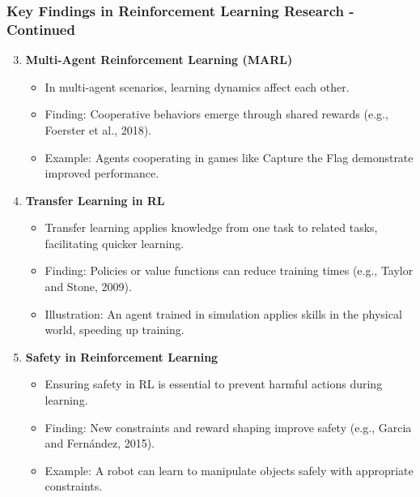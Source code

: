 \documentclass[aspectratio=169]{beamer}
\begin{document}
\begin{frame}[fragile]
    \frametitle{Key Findings in Reinforcement Learning Research - Continued}
    \begin{enumerate}
        \setcounter{enumi}{2} %
        \item \textbf{Multi-Agent Reinforcement Learning (MARL)}
        \begin{itemize}
            \item In multi-agent scenarios, learning dynamics affect each other.
            \item Finding: Cooperative behaviors emerge through shared rewards (e.g., Foerster et al., 2018).
            \item Example: Agents cooperating in games like Capture the Flag demonstrate improved performance.
        \end{itemize}
        
        \item \textbf{Transfer Learning in RL}
        \begin{itemize}
            \item Transfer learning applies knowledge from one task to related tasks, facilitating quicker learning.
            \item Finding: Policies or value functions can reduce training times (e.g., Taylor and Stone, 2009).
            \item Illustration: An agent trained in simulation applies skills in the physical world, speeding up training.
        \end{itemize}

        \item \textbf{Safety in Reinforcement Learning}
        \begin{itemize}
            \item Ensuring safety in RL is essential to prevent harmful actions during learning.
            \item Finding: New constraints and reward shaping improve safety (e.g., Garcia and Fernández, 2015).
            \item Example: A robot can learn to manipulate objects safely with appropriate constraints.
        \end{itemize}
    \end{enumerate}
\end{frame}
\end{document}
